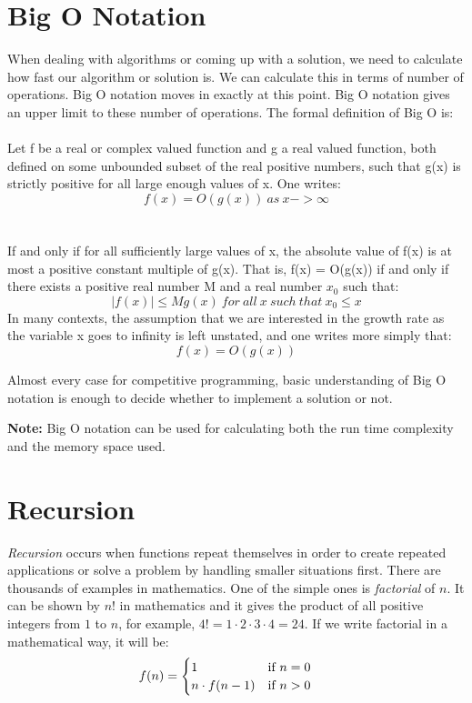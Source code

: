 \documentclass[12pt]{article}
\begin{document}
\section{Big O Notation}

When dealing with algorithms or coming up with a solution, we need to calculate how fast our algorithm or solution is. We can calculate this in terms of number of operations. Big O notation moves in exactly at this point. Big O notation gives an upper limit to these number of operations. The formal definition of Big O is\cite{bigo}:\\ \ \\
Let f be a real or complex valued function and g a real valued function, both defined on some unbounded subset of the real positive numbers, such that g(x) is strictly positive for all large enough values of x. One writes:\\
$$f(x) = O(g(x)) \ as\  x -> \infty$$ \\ \ \\
If and only if for all sufficiently large values of x, the absolute value of f(x) is at most a positive constant multiple of g(x). That is, f(x) = O(g(x)) if and only if there exists a positive real number M and a real number $x_0$ such that: \\
$$|f(x)| \leq Mg(x)\ for \ all\ x\ such\ that\ x_0 \leq x$$
In many contexts, the assumption that we are interested in the growth rate as the variable x goes to infinity is left unstated, and one writes more simply that:
$$f(x) = O(g(x))$$

Almost every case for competitive programming, basic understanding of Big O notation is enough to decide whether to implement a solution or not.

\textbf{Note:} Big O notation can be used for calculating both the run time complexity and the memory space used.

\section{Recursion}

\emph{Recursion} occurs when functions repeat themselves in order to create repeated applications or solve a problem by handling smaller situations first. There are thousands of examples in mathematics. One of the simple ones is \emph{factorial} of $n$. It can be shown by $n!$ in mathematics and it gives the product of all positive integers from $1$ to $n$, for example, $4! = 1\cdot 2\cdot 3\cdot 4 = 24$. If we write factorial in a mathematical way, it will be:
\begin{align*}
    f(n) &= \begin{cases}
    1 & \text{if $n = 0$\,\, } \\
    n\cdot f(n - 1) & \text{if $n > 0$\,\,}
    \end{cases}
\end{align*}
\end{document}
